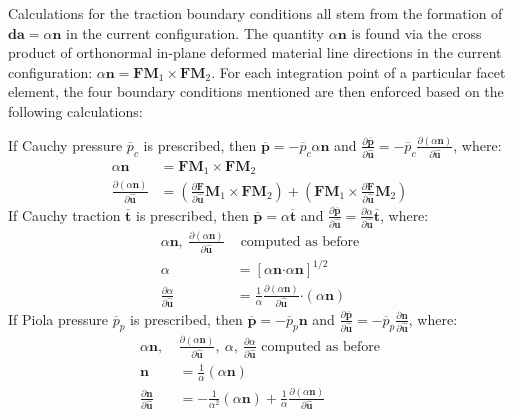 Calculations for the traction boundary conditions all stem from the formation of ${\bm {da}} = \alpha{\bm n}$ in the current configuration. The quantity $\alpha{\bm n}$ is found via the cross product of orthonormal in-plane deformed material line directions in the current configuration: ${\alpha}{\bm n} = {\bm F}{\bm M}_1 \times {\bm F}{\bm M}_2$. For each integration point of a particular facet element, the four boundary conditions mentioned are then enforced based on the following calculations:

If Cauchy pressure $\overline{p}_c$ is prescribed, then $\bm {\overline{p}} = {-\overline{p}_c}\alpha{\bm n}$ and $\frac{\partial \bm {\overline{p}}}{\partial \hat {\bm{u}}} = {-\overline{p}_c}\frac{\partial (\alpha {\bm n})}{\partial {\hat {\bm{u}}}}$, where:
\begin{align}
\alpha{\bm n} &= {\bm F}{\bm M}_1 \times {\bm F}{\bm M}_2 \\
\frac{\partial (\alpha{\bm n})}{\partial {\hat {\bm{u}}}} &= (\frac{\partial {\bm F}}{\partial {\hat {\bm{u}}}}{\bm M}_1 \times {\bm F}{\bm M}_2) + ({\bm F}{\bm M}_1 \times \frac{\partial {\bm F}}{\partial {\hat {\bm{u}}}}{\bm M}_2)
\end{align}
If Cauchy traction $\overline{\bm{t}}$ is prescribed, then $\bm {\overline{p}} = \alpha{\overline{\bm{t}}}$ and $\frac{\partial \bm {\overline{p}}}{\partial {\hat {\bm{u}}}} = \frac{\partial \alpha}{\partial {\hat {\bm{u}}}}{\overline{\bm{t}}}$, where:
\begin{align}
{\alpha \bm n}, \ \frac{\partial (\alpha {\bm n})}{\partial {\hat {\bm{u}}}} &\text{ computed as before} \nonumber \\
\alpha &= [\alpha {\bm n} \bm{\cdot} \alpha {\bm n}]^{1/2} \\
 \frac{\partial{\alpha}}{\partial {\hat {\bm{u}}}} &= \frac{1}{\alpha}\frac{\partial({\alpha {\bm n}})}{\partial {\hat {\bm{u}}}} \bm{\cdot} ({\alpha \bm n})
\end{align}
If Piola pressure $\overline{p}_p$ is prescribed, then $\bm{\overline{p}} = {-\overline{p}_p}{\bm n}$ and $\frac{\partial \bm {\overline{p}}}{\partial {\hat {\bm{u}}}} = {-\overline{p}_p}\frac{\partial {\bm n}}{\partial {\hat {\bm{u}}}}$, where:
\begin{align}
{\alpha \bm n}, \ &\frac{\partial (\alpha {\bm n})}{\partial {\hat {\bm{u}}}}, \ \alpha, \ \frac{\partial \alpha}{\partial {\hat {\bm{u}}}} \text{ computed as before} \nonumber \\
{\bm n} &= \frac{1}{\alpha}(\alpha {\bm n}) \\
\frac{\partial {\bm n}}{\partial {\hat {\bm{u}}}} &= -\frac{1}{\alpha^2}(\alpha {\bm n}) + \frac{1}{\alpha}\frac{\partial (\alpha{\bm n})}{\partial {\hat {\bm{u}}}}
\end{align}

